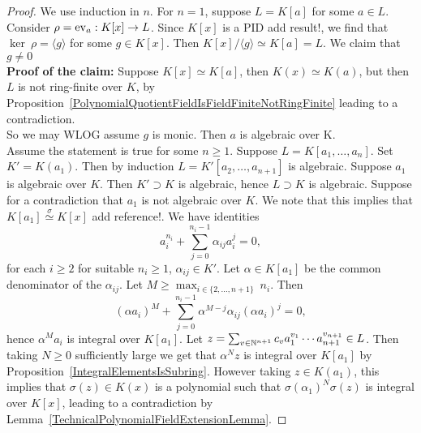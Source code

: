 \begin{proof}
    We use induction in $n$. For $n=1$, suppose $L=K[a]$ for some $a\in L$. Consider $\rho = \mathrm{ev}_a : K[x]\rightarrow L$. Since $K[x]$ is a PID {\LARGE add result!}, we find that $\ker\ \rho = \langle g \rangle$ for some $g\in K[x]$. Then $K[x]/\langle g\rangle \simeq K[a] = L$. We claim that $g\neq 0$\\
    \textbf{Proof of the claim:} Suppose $K[x]\simeq K[a]$, then $K(x) \simeq K(a)$, but then $L$ is not ring-finite over $K$, by Proposition~\ref{PolynomialQuotientFieldIsFieldFiniteNotRingFinite} leading to a contradiction.\\
    So we may WLOG assume $g$ is monic. Then $a$ is algebraic over K.\\
    Assume the statement is true for some $n\geq 1$. Suppose $L=K[a_1,\dots,a_n]$. Set $K' = K(a_1)$. Then by induction $L=K'[a_2,\dots,a_{n+1}]$ is algebraic. Suppose $a_1$ is algebraic over $K$. Then $K'\supset K$ is algebraic, hence $L\supset K$ is algebraic. Suppose for a contradiction that $a_1$ is not algebraic over $K$. We note that this implies that $K[a_1]\overset{\sigma}{\simeq} K[x]$ {\LARGE add reference!}. We have identities 
    $$a_i^{n_i}+\sum_{j=0}^{n_i-1} \alpha_{ij}a_i^{j}=0,$$
    for each $i\geq 2$ for suitable $n_i\geq 1$, $\alpha_{ij}\in K'$. Let $\alpha\in K[a_1]$ be the common denominator of the $\alpha_{ij}$. Let $M\geq \max_{i\in\{2,\dots,n+1\}}\ n_i$. Then 
    $$\left(\alpha a_i\right)^{M}+\sum_{j=0}^{n_i-1} \alpha^{M-j}\alpha_{ij} \left(\alpha a_i\right)^j=0,$$
    hence $\alpha^Ma_i$ is integral over $K[a_1]$.
    Let $z = \sum_{v\in \mathbb{N}^{n+1}} c_va_1^{v_1}\cdots a_{n+1}^{v_{n+1}}\in L$. Then taking $N\geq 0$ sufficiently large we get that $\alpha^N z$ is integral over $K[a_1]$ by Proposition~\ref{IntegralElementsIsSubring}. However taking $z\in K(a_1)$, this implies that $\sigma(z)\in K(x)$ is a polynomial such that $\sigma(\alpha_1)^N\sigma(z)$ is integral over $K[x]$, leading to a contradiction by Lemma~\ref{TechnicalPolynomialFieldExtensionLemma}.
\end{proof}

